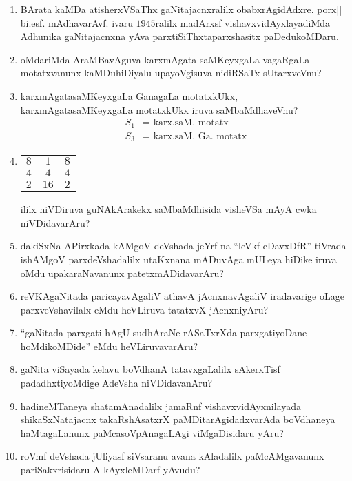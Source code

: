 \begin{enumerate}
\item BArata kaMDa atisherxVSaThx gaNitajacnxralilx obabxrAgidAdxre. porx|| bi.esf. mAdhavarAvf. ivaru $1945$ralilx madArxsf vishavxvidAyxlayadiMda Adhunika gaNitajacnxna yAva parxtiSiThxtaparxshasitx paDedukoMDaru.
  
\item oMdariMda AraMBavAguva karxmAgata saMKeyxgaLa vagaRgaLa motatxvanunx kaMDuhiDiyalu upayoVgisuva nidiRSaTx sUtarxveVnu?

  
  
\item karxmAgatasaMKeyxgaLa GanagaLa motatxkUkx, karxmAgatasaMKeyxgaLa motatxkUkx iruva saMbaMdhaveVnu?
  \begin{align*}
    S_1 & = \text{ karx.saM. motatx}\\
    S_3 & = \text{ karx.saM. Ga. motatx}
  \end{align*}
  
\item
    \begin{tabular}[t]{ccc}
    $8$&$1$&$8$\\
    $4$&$4$&$4$\\
    $2$&$16$&$2$
  \end{tabular}

  ililx niVDiruva guNAkArakekx saMbaMdhisida visheVSa mAyA cwka niVDidavarAru?
  
\item dakiSxNa APirxkada kAMgoV deVshada jeYrf na ``leVkf eDavxDfR'' tiVrada ishAMgoV parxdeVshadalilx utaKxnana mADuvAga mULeya hiDike iruva oMdu upakaraNavanunx patetxmADidavarAru?

\item reVKAgaNitada paricayavAgaliV athavA jAcnxnavAgaliV iradavarige oLage parxveVshavilalx eMdu heVLiruva tatatxvX jAcnxniyAru?

\item ``gaNitada parxgati hAgU sudhAraNe rASaTxrXda parxgatiyoDane hoMdikoMDide'' eMdu heVLiruvavarAru?

\item gaNita viSayada kelavu boVdhanA tatavxgaLalilx sAkerxTisf padadhxtiyoMdige AdeVsha niVDidavanAru?

\item hadineMTaneya shatamAnadalilx jamaRnf vishavxvidAyxnilayada shikaSxNatajacnx takaRshAsatxrX paMDitarAgidadxvarAda boVdhaneya haMtagaLanunx paMcasoVpAnagaLAgi viMgaDisidaru yAru?

\item roVmf deVshada jUliyasf siVsaranu avana kAladalilx paMcAMgavanunx pariSakxrisidaru A kAyxleMDarf yAvudu?


\end{enumerate}
